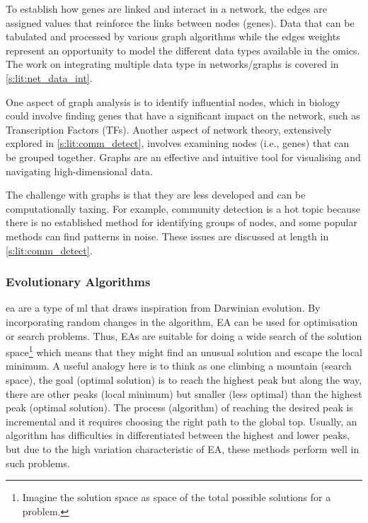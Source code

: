 To establish how genes are linked and interact in a network, the edges are assigned values that reinforce the links between nodes (genes). Data that can be tabulated and processed by various graph algorithms while the edges weights represent an opportunity to model the different data types available in the omics. The work on integrating multiple data type in networks/graphs is covered in \cref{s:lit:net_data_int}.

One aspect of graph analysis is to identify influential nodes, which in biology could involve finding genes that have a significant impact on the network, such as Transcription Factors (TFs). Another aspect of network theory, extensively explored in \cref{s:lit:comm_detect}, involves examining nodes (i.e., genes) that can be grouped together. Graphs are an effective and intuitive tool for visualising and navigating high-dimensional data.

The challenge with graphs is that they are less developed and can be computationally taxing. For example, community detection is a hot topic because there is no established method for identifying groups of nodes, and some popular methods can find patterns in noise. These issues are discussed at length in \cref{s:lit:comm_detect}.


\subsubsection{Evolutionary Algorithms} \label{s:lit:ea_overview}


\acrlong{ea} are a type of \acrshort{ml} that draws inspiration from Darwinian evolution. By incorporating random changes in the algorithm, EA can be used for optimisation or search problems. Thus, EAs are suitable for doing a wide search of the solution space\footnote{Imagine the solution space as space of the total possible solutions for a problem.} which means that they might find an unusual solution and escape the local minimum. A useful analogy here is to think as one climbing a mountain (search space), the goal (optimal solution) is to reach the highest peak but along the way, there are other peaks (local minimum) but smaller (less optimal) than the highest peak (optimal solution). The process (algorithm) of reaching the desired peak is incremental and it requires choosing the right path to the global top. Usually, an algorithm has difficulties in differentiated between the highest and lower peaks, but due to the high variation characteristic of EA, these methods perform well in such problems.


